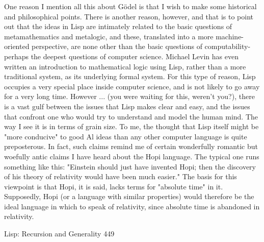         One reason I mention all this about Gödel is that I wish to make some
historical and philosophical points. There is another reason, however, and that is to
point out that the ideas in Lisp are intimately related to the basic questions of
metamathematics and metalogic, and these, translated into a more machine-oriented
perspective, are none other than the basic questions of computability-perhaps the
deepest questions of computer science. Michael Levin has even written an
introduction to mathematical logic using Lisp, rather than a more traditional system,
as its underlying formal system. For this type of reason, Lisp occupies a very special
place inside computer science, and is not likely to go away for a very long time.
        However ... (you were waiting for this, weren't you?), there is a vast gulf
between the issues that Lisp makes clear and easy, and the issues that confront one
who would try to understand and model the human mind. The way I see it is in terms
of grain size. To me, the thought that Lisp itself might be "more conducive" to good
Al ideas than any other computer language is quite preposterous. In fact, such claims
remind me of certain wonderfully romantic but woefully antic claims I have heard
about the Hopi language. The typical one runs something like this: "Einstein should
just have invented Hopi; then the discovery of his theory of relativity would have
been much easier." The basis for this viewpoint is that Hopi, it is said, lacks terms for
"absolute time" in it. Supposedly, Hopi (or a language with similar properties) would
therefore be the ideal language in which to speak of relativity, since absolute time is
abandoned in relativity.




Lisp: Recursion and Generality                                                       449


